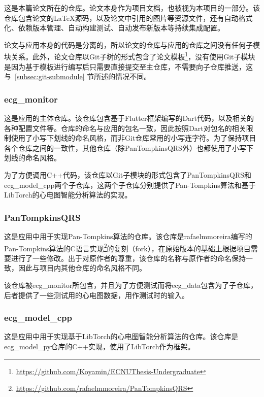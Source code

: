 这是本篇论文所在的仓库。论文本身作为项目文档，也被视为本项目的一部分。该仓库包含论文的\LaTeX 源码，以及论文中引用的图片等资源文件，还有自动格式化、依赖版本管理、自动构建测试、自动发布新版本等持续集成配置。

论文与应用本身的代码是分离的，所以论文的仓库与应用的仓库之间没有任何子模块关系。此外，论文仓库以Git子树的形式包含了论文模板\footnote{\url{https://github.com/Koyamin/ECNUThesis-Undergraduate}}，没有使用Git子模块是因为基于模板进行编写后只需要直接提交至主仓库，不需要向子仓库推送，这与~\ref{subsec:git-submodule} 节所述的情况不同。

\subsubsection{ecg\_monitor}\label{subsubsec:repo-monitor}

这是应用的主体仓库。该仓库包含基于Flutter框架编写的Dart代码，以及相关的各种配置文件等。仓库的命名与应用的包名一致，因此按照Dart对包名的相关限制使用了小写下划线的命名风格，而非Git仓库常用的小写连字符。为了保持项目各个仓库之间的一致性，其他仓库（除PanTompkinsQRS外）也都使用了小写下划线的命名风格。

为了方便调用C++代码，该仓库以Git子模块的形式包含了PanTompkinsQRS和ecg\_model\_cpp两个子仓库，这两个子仓库分别提供了Pan-Tompkins算法和基于LibTorch的心电图智能分析算法的实现。

\subsubsection{PanTompkinsQRS}\label{subsubsec:repo-qrs}

这是应用中用于实现Pan-Tompkins算法的仓库。该仓库是rafaelmmoreira编写的Pan-Tompkins算法的C语言实现\footnote{\url{https://github.com/rafaelmmoreira/PanTompkinsQRS}}的复刻（fork），在原始版本的基础上根据项目需要进行了一些修改。出于对原作者的尊重，该仓库的名称与原作者的命名保持一致，因此与项目内其他仓库的命名风格不同。

该仓库被ecg\_monitor所包含，并且为了方便测试而将ecg\_data包含为了子仓库，后者提供了一些测试用的心电图数据，用作测试时的输入。

\subsubsection{ecg\_model\_cpp}\label{subsubsec:repo-cpp}

这是应用中用于实现基于LibTorch的心电图智能分析算法的仓库。该仓库是ecg\_model\_py仓库的C++实现，使用了LibTorch作为框架。

